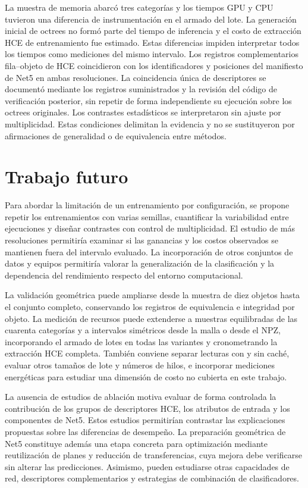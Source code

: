 La muestra de memoria abarcó tres categorías y los tiempos GPU y CPU tuvieron una diferencia de instrumentación en el armado del lote. La generación inicial de octrees no formó parte del tiempo de inferencia y el costo de extracción HCE de entrenamiento fue estimado. Estas diferencias impiden interpretar todos los tiempos como mediciones del mismo intervalo. Los registros complementarios fila--objeto de HCE coincidieron con los identificadores y posiciones del manifiesto de Net5 en ambas resoluciones. La coincidencia única de descriptores se documentó mediante los
registros suministrados y la revisión del código de verificación
posterior, sin repetir de forma independiente su ejecución sobre
los octrees originales. Los contrastes estadísticos se interpretaron sin ajuste por multiplicidad. Estas condiciones delimitan la evidencia y no se sustituyeron por afirmaciones de generalidad o de equivalencia entre métodos.

\section{Trabajo futuro}
Para abordar la limitación de un entrenamiento por configuración, se propone repetir los entrenamientos con varias semillas, cuantificar la variabilidad entre ejecuciones y diseñar contrastes con control de multiplicidad. El estudio de más resoluciones permitiría examinar si las ganancias y los costos observados se mantienen fuera del intervalo evaluado. La incorporación de otros conjuntos de datos y equipos permitiría valorar la generalización de la clasificación y la dependencia del rendimiento respecto del entorno computacional.

La validación geométrica puede ampliarse desde la muestra de diez objetos hasta el conjunto completo, conservando los registros de equivalencia e integridad por objeto. La medición de recursos puede extenderse a muestras equilibradas de las cuarenta categorías y a intervalos simétricos desde la malla o desde el NPZ, incorporando el armado de lotes en todas las variantes y cronometrando la extracción HCE completa. También conviene separar lecturas con y sin caché, evaluar otros tamaños de lote y números de hilos, e incorporar mediciones energéticas para estudiar una dimensión de costo no cubierta en este trabajo.

La ausencia de estudios de ablación motiva evaluar de forma controlada la contribución de los grupos de descriptores HCE, los atributos de entrada y los componentes de Net5. Estos estudios permitirían contrastar las explicaciones propuestas sobre las diferencias de desempeño. La preparación geométrica de Net5 constituye además una etapa concreta para optimización mediante reutilización de planes y reducción de transferencias, cuya mejora debe verificarse sin alterar las predicciones. Asimismo, pueden estudiarse otras capacidades de red, descriptores complementarios y estrategias de combinación de clasificadores.

